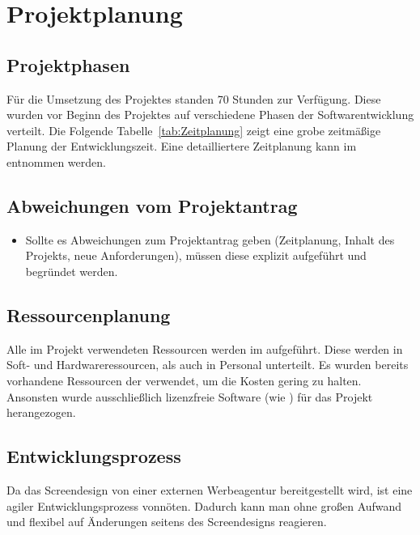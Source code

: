 \section{Projektplanung} 
\label{sec:Projektplanung}


\subsection{Projektphasen}
\label{sec:Projektphasen}

Für die Umsetzung des Projektes standen 70 Stunden zur Verfügung. Diese wurden vor
Beginn des Projektes auf verschiedene Phasen der Softwarentwicklung verteilt.
Die Folgende Tabelle~\ref{tab:Zeitplanung} zeigt eine grobe zeitmäßige Planung
der Entwicklungszeit.
Eine detailliertere Zeitplanung kann im  entnommen werden.




\subsection{Abweichungen vom Projektantrag}
\label{sec:AbweichungenProjektantrag}

\begin{itemize}
	\item Sollte es Abweichungen zum Projektantrag geben (\zB Zeitplanung, Inhalt des Projekts, neue Anforderungen),
	 müssen diese explizit aufgeführt und begründet werden.
\end{itemize}


\subsection{Ressourcenplanung}
\label{sec:Ressourcenplanung}
Alle im Projekt verwendeten Ressourcen werden im 
aufgeführt. Diese werden in Soft- und Hardwareressourcen, als auch in Personal
unterteilt. Es wurden bereits vorhandene Ressourcen der \mh verwendet, um die
Kosten gering zu halten. Ansonsten wurde ausschließlich lizenzfreie Software (wie \zB
{}) für das Projekt herangezogen.



\subsection{Entwicklungsprozess}
\label{sec:Entwicklungsprozess}
Da das Screendesign von einer externen Werbeagentur bereitgestellt wird, ist
eine agiler Entwicklungsprozess vonnöten. Dadurch kann man ohne großen Aufwand
und flexibel auf Änderungen seitens des Screendesigns reagieren.


